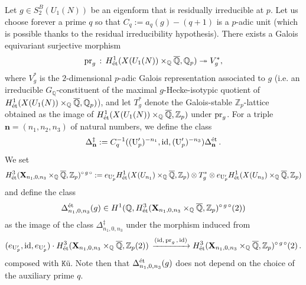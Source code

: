 \documentclass{amsart}
\numberwithin{equation}{section}
\newcommand{\QQ}{\mathbb{Q}}
\newcommand{\ZZ}{\mathbb{Z}}
\newcommand{\etale}{\textup{\'et}}
\begin{document}
 

\subsubsection{} 
\label{subsubsec_2025_07_02_1527}
Let $g \in S_2^B(U_1(N))$ be an eigenform that is residually irreducible at $p$.  %
Let us choose forever a prime $q$ so that $C_q:=a_q(g)-(q+1)$ is a $p$-adic unit (which is possible thanks to the residual irreducibility hypothesis). There exists a Galois equivariant surjective morphism 
$${\rm pr}_g\,:\,H^1_{\etale} (X(U_1(N))\times_{\QQ}
\overline{\QQ}, \QQ_p) \twoheadrightarrow V_g^*,$$
where $V_g^*$ is the $2$-dimensional $p$-adic Galois representation associated to $g$ (i.e. an irreducible $G_\QQ$-constituent of the maximal $g$-Hecke-isotypic quotient of $H^1_{\etale} (X(U_1(N))\times_{\QQ}
\overline{\QQ}, \QQ_p)$), and let $T_g^*$ denote the Galois-stable $\ZZ_p$-lattice obtained as the image of $H^1_{\etale} (X(U_1(N))\times_{\QQ}
\overline{\QQ}, \ZZ_p)$ under ${\rm pr}_g$. For a triple $\mathbf{n}=(n_1,n_2,n_3)$ of natural numbers, we define the class
$$\Delta_{\mathbf{n}}^{\ddagger}:=C_q^{-1}((\mathrm{U}_{p}')^{-n_1},{\rm id},(\mathrm{U}_{p}')^{-n_3})\Delta_{\mathbf{n}}^{\etale}\,.$$ 
We set
$$H^3_{\etale}(\mathbf{X}_{n_1,0,n_3}\times_{\QQ}
\overline{\QQ},\ZZ_p)^{\circ \,g\, \circ} := e_{\mathrm{U}_{p}'} H^1_{\etale} (X(U_{n_1})\times_{\QQ}
\overline{\QQ}, \ZZ_p)\otimes T_g^* \otimes e_{\mathrm{U}_{p}'} H^1_{\etale} (X(U_{n_3})\times_{\QQ}
\overline{\QQ}, \ZZ_p)$$
 and define the class 
$$\Delta_{n_1,0,n_3}^{\etale}(g)\in  H^1(\QQ,  H^3_{\etale}(\mathbf{X}_{n_1,0,n_3}\times_{\QQ}
\overline{\QQ},\ZZ_p)^{\circ \,g\, \circ}(2))$$ as the image of the class 
$\Delta_{n_1,0,n_3}^{\ddagger}$
under the morphism induced from 
\begin{align*}
    (e_{\mathrm{U}_{p}'}, {\rm id}, e_{\mathrm{U}_{p}'})\cdot  H^3_{\etale} (\mathbf{X}_{n_1,0,n_3}\times_{\QQ}
\overline{\QQ}, \ZZ_p(2)) \,\xrightarrow{({\rm id},\,{\rm pr}_g\,,\,{\rm id})}  H^3_{\etale}(\mathbf{X}_{n_1,0,n_3}\times_{\QQ}
\overline{\QQ},\ZZ_p)^{\circ \,g\, \circ}(2)\,.\end{align*}
composed with $\texttt{K\"u}$. Note then that $\Delta_{n_1,0,n_3}^{\etale}(g)$ does not depend on the choice of the auxiliary prime $q$. 
\end{document}
